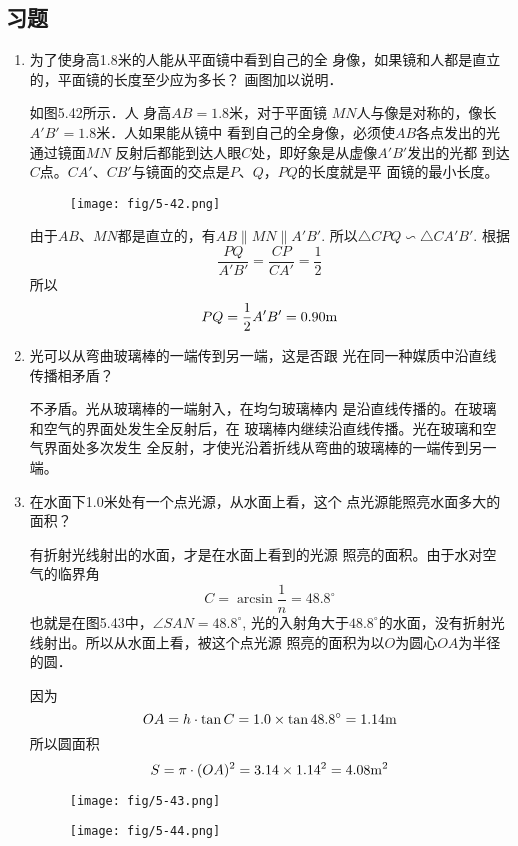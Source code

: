 \subsection{习题}
\begin{enumerate}
    \item 为了使身高1.8米的人能从平面镜中看到自己的全
身像，如果镜和人都是直立的，平面镜的长度至少应为多长？
画图加以说明．

\begin{solution}
如图5.42所示．人 
身高$AB=1.8$米，对于平面镜
$MN$人与像是对称的，像长$A'B'=1.8$米．人如果能从镜中
看到自己的全身像，必须使$AB$各点发出的光通过镜面$MN$
反射后都能到达人眼$C$处，即好象是从虚像$A'B'$发出的光都
到达$C$点。$CA'$、$CB'$与镜面的交点是$P$、$Q$，$PQ$的长度就是平
面镜的最小长度。
\begin{figure}[htp]
    \centering
    \texttt{[image: fig/5-42.png]}
    \caption{}
\end{figure}

由于$AB$、$MN$都是直立的，有$AB\parallel MN\parallel A'B'$. 所以$\triangle CPQ\backsim \triangle CA'B'$. 根据
\[\frac{PQ}{A'B'}=\frac{CP}{CA'}=\frac{1}{2}\]
所以
\[PQ=\frac{1}{2}A'B'=0.90{\rm m}\]
\end{solution}
\item 光可以从弯曲玻璃棒的一端传到另一端，这是否跟
光在同一种媒质中沿直线传播相矛盾？

\begin{solution}
    不矛盾。光从玻璃棒的一端射入，在均匀玻璃棒内
    是沿直线传播的。在玻璃和空气的界面处发生全反射后，在
    玻璃棒内继续沿直线传播。光在玻璃和空气界面处多次发生
    全反射，才使光沿着折线从弯曲的玻璃棒的一端传到另一端。
\end{solution}
\item 在水面下1.0米处有一个点光源，从水面上看，这个
点光源能照亮水面多大的面积？

\begin{solution}
    有折射光线射出的水面，才是在水面上看到的光源
    照亮的面积。由于水对空气的临界角
\[    C=\arcsin\frac{1}{n}=48.8^{\circ}\]
    也就是在图5.43中，$\angle SAN=48.8^{\circ}$, 光的入射角大于$48.8^{\circ}$的水面，没有折射光线射出。所以从水面上看，被这个点光源
    照亮的面积为以$O$为圆心$OA$为半径的圆．

    因为
    \[OA=h\cdot \tan C=1.0\times\tan48.8^{\circ}=1.14{\rm m}\]
    所以圆面积
    \[S=\pi\cdot (OA)^2=3.14\times1.14^2=4.08{\rm m^2}\]
\end{solution}

\begin{figure}[htp]\centering
    \begin{minipage}[t]{0.48\textwidth}
    \centering
\texttt{[image: fig/5-43.png]}
    \caption{}
    \end{minipage}
    \begin{minipage}[t]{0.48\textwidth}
    \centering
\texttt{[image: fig/5-44.png]}
    \caption{}
    \end{minipage}
    \end{figure}


\end{enumerate}
